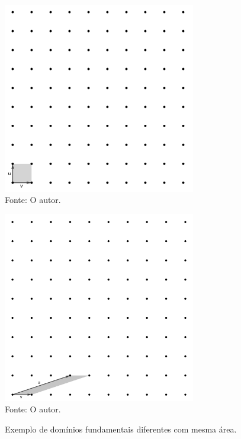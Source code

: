    \begin{figure}[htb!]
        \caption{Exemplo de domínios fundamentais diferentes com mesma área.}
        \begin{minipage}[c]{0.5\linewidth}
            \centering
            \includegraphics[width=0.75\textwidth]{Figuras/dominio_fundamental_1.png}\\
            \footnotesize{Fonte: O autor.}
        \end{minipage}\hfill
        \begin{minipage}[c]{0.5\linewidth}
            \centering
            \includegraphics[width=0.75\textwidth]{Figuras/dominio_fundamental_2.png}\\
            \footnotesize{Fonte: O autor.}
        \end{minipage}
        \label{fig:dominio_fundamental_2}
    \end{figure}
    

